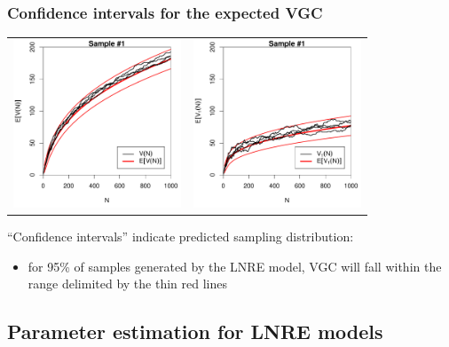 \documentclass[t]{beamer} %
\begin{document}
\begin{frame}
  \frametitle{Confidence intervals for the expected VGC}

  \ungap[1]
  \begin{center}
    \begin{tabular}{c @{} c}
      \includegraphics[width=50mm]{img/05-samples-vgc-exp-vs-samples-conf} &
      \includegraphics[width=50mm]{img/05-samples-vgc-V1-exp-vs-samples-conf}
    \end{tabular}
  \end{center}

  ``Confidence intervals'' indicate predicted sampling distribution:
  \begin{itemize}
  \item[\hand] for 95\% of samples generated by the LNRE model, VGC will fall within the range delimited by the thin red lines
  \end{itemize}

\end{frame}

\subsection{Parameter estimation for LNRE models }
\end{document}
